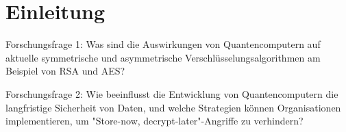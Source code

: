 \section{Einleitung}
Forschungsfrage 1: 
Was sind die Auswirkungen von Quantencomputern auf 
aktuelle symmetrische und asymmetrische Verschlüsselungsalgorithmen 
am Beispiel von RSA und AES?

Forschungsfrage 2: 
Wie beeinflusst die Entwicklung von Quantencomputern die langfristige 
Sicherheit von Daten, und welche Strategien können Organisationen 
implementieren, um "Store-now, decrypt-later"-Angriffe zu verhindern?